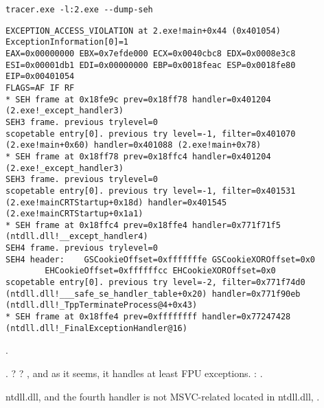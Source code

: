 \begin{lstlisting}
tracer.exe -l:2.exe --dump-seh
\end{lstlisting}

\begin{lstlisting}[caption=tracer.exe output]
EXCEPTION_ACCESS_VIOLATION at 2.exe!main+0x44 (0x401054) ExceptionInformation[0]=1
EAX=0x00000000 EBX=0x7efde000 ECX=0x0040cbc8 EDX=0x0008e3c8
ESI=0x00001db1 EDI=0x00000000 EBP=0x0018feac ESP=0x0018fe80
EIP=0x00401054
FLAGS=AF IF RF
* SEH frame at 0x18fe9c prev=0x18ff78 handler=0x401204 (2.exe!_except_handler3)
SEH3 frame. previous trylevel=0
scopetable entry[0]. previous try level=-1, filter=0x401070 (2.exe!main+0x60) handler=0x401088 (2.exe!main+0x78)
* SEH frame at 0x18ff78 prev=0x18ffc4 handler=0x401204 (2.exe!_except_handler3)
SEH3 frame. previous trylevel=0
scopetable entry[0]. previous try level=-1, filter=0x401531 (2.exe!mainCRTStartup+0x18d) handler=0x401545 (2.exe!mainCRTStartup+0x1a1)
* SEH frame at 0x18ffc4 prev=0x18ffe4 handler=0x771f71f5 (ntdll.dll!__except_handler4)
SEH4 frame. previous trylevel=0
SEH4 header:	GSCookieOffset=0xfffffffe GSCookieXOROffset=0x0
		EHCookieOffset=0xffffffcc EHCookieXOROffset=0x0
scopetable entry[0]. previous try level=-2, filter=0x771f74d0 (ntdll.dll!___safe_se_handler_table+0x20) handler=0x771f90eb (ntdll.dll!_TppTerminateProcess@4+0x43)
* SEH frame at 0x18ffe4 prev=0xffffffff handler=0x77247428 (ntdll.dll!_FinalExceptionHandler@16)
\end{lstlisting}

. 

. ?
?
, 
{and as it seems, it handles at least \ac{FPU} exceptions}.
: .

 ntdll.dll, 
{and the fourth handler is not MSVC-related located in} ntdll.dll,
.

